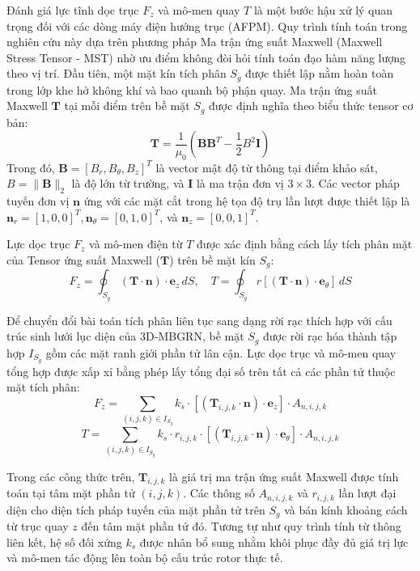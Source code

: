 Đánh giá lực tĩnh dọc trục $F_z$ và mô-men quay $T$ là một bước hậu xử lý quan trọng đối với các dòng máy điện hướng trục (AFPM). Quy trình tính toán trong nghiên cứu này dựa trên phương pháp Ma trận ứng suất Maxwell (Maxwell Stress Tensor - MST) nhờ ưu điểm không đòi hỏi tính toán đạo hàm năng lượng theo vị trí. Đầu tiên, một mặt kín tích phân $S_g$ được thiết lập nằm hoàn toàn trong lớp khe hở không khí và bao quanh bộ phận quay. Ma trận ứng suất Maxwell $\mathbf{T}$ tại mỗi điểm trên bề mặt $S_g$ được định nghĩa theo biểu thức tensor cơ bản:
\begin{equation}
    \mathbf{T} = \frac{1}{\mu_0} \left( \mathbf{B} \mathbf{B}^T - \frac{1}{2} B^2 \mathbf{I} \right)
\end{equation}
Trong đó, $\mathbf{B} = [B_r, B_\theta, B_z]^T$ là vector mật độ từ thông tại điểm khảo sát, $B = \|\mathbf{B}\|_2$ là độ lớn từ trường, và $\mathbf{I}$ là ma trận đơn vị $3 \times 3$. Các vector pháp tuyến đơn vị $\mathbf{n}$ ứng với các mặt cắt trong hệ tọa độ trụ lần lượt được thiết lập là $\mathbf{n}_r = [1, 0, 0]^T, \mathbf{n}_\theta = [0, 1, 0]^T$, và $\mathbf{n}_z = [0, 0, 1]^T$.

Lực dọc trục $F_z$ và mô-men điện từ $T$ được xác định bằng cách lấy tích phân mặt của Tensor ứng suất Maxwell ($\mathbf{T}$) trên bề mặt kín $S_g$:
\begin{equation}
    F_z = \oint_{S_g} (\mathbf{T} \cdot \mathbf{n}) \cdot \mathbf{e}_z \, dS, \quad T = \oint_{S_g} r [(\mathbf{T} \cdot \mathbf{n}) \cdot \mathbf{e}_\theta] \, dS
\end{equation}

Để chuyển đổi bài toán tích phân liên tục sang dạng rời rạc thích hợp với cấu trúc sinh lưới lục diện của 3D-MBGRN, bề mặt $S_g$ được rời rạc hóa thành tập hợp $I_{S_g}$ gồm các mặt ranh giới phần tử lân cận. Lực dọc trục và mô-men quay tổng hợp được xấp xỉ bằng phép lấy tổng đại số trên tất cả các phần tử thuộc mặt tích phân:
\begin{equation}
    F_z = \sum_{(i,j,k) \in I_{S_g}} k_s \cdot [(\mathbf{T}_{i,j,k} \cdot \mathbf{n}) \cdot \mathbf{e}_z] \cdot A_{n,i,j,k}
\end{equation}
\begin{equation}
    T = \sum_{(i,j,k) \in I_{S_g}} k_s \cdot r_{i,j,k} \cdot [(\mathbf{T}_{i,j,k} \cdot \mathbf{n}) \cdot \mathbf{e}_\theta] \cdot A_{n,i,j,k}
\end{equation}

Trong các công thức trên, $\mathbf{T}_{i,j,k}$ là giá trị ma trận ứng suất Maxwell được tính toán tại tâm mặt phần tử $(i, j, k)$. Các thông số $A_{n,i,j,k}$ và $r_{i,j,k}$ lần lượt đại diện cho diện tích pháp tuyến của mặt phần tử trên $S_g$ và bán kính khoảng cách từ trục quay $z$ đến tâm mặt phần tử đó. Tương tự như quy trình tính từ thông liên kết, hệ số đối xứng $k_s$ được nhân bổ sung nhằm khôi phục đầy đủ giá trị lực và mô-men tác động lên toàn bộ cấu trúc rotor thực tế.